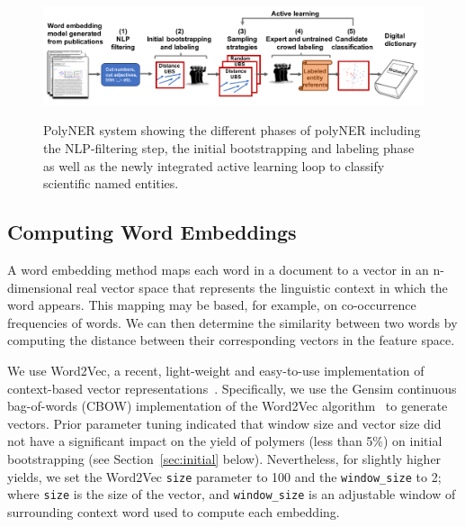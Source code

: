 \begin{figure}[!t]
{\includegraphics[width=\textwidth]{figures/architecture.pdf}}
\caption{\label{fig:architecture} PolyNER system showing the different phases of polyNER including the NLP-filtering step, the initial bootstrapping and labeling phase as well as the newly integrated active learning loop to classify scientific named entities. 
}
\end{figure}
\setlength{\belowcaptionskip}{-10pt}

\subsection{Computing Word Embeddings}\label{sec:wordembeddings}
A word embedding method maps each word
in a document to a vector in an n-dimensional real vector space that
represents the linguistic context in which the word appears. This mapping may
be based, for example, on co-occurrence frequencies of words. 
We can then determine the similarity between two words by computing the distance between
their corresponding vectors in the feature space.


We use Word2Vec, a recent, light-weight and easy-to-use implementation of context-based vector representations~\cite{mikolov2013efficient,mikolov2013distributed}.
Specifically, we use the Gensim continuous bag-of-words
(CBOW) implementation of the Word2Vec
algorithm~\cite{rehurek2010software} to generate vectors.
Prior parameter tuning indicated that window size and vector size did not have a significant impact on the yield of polymers (less than 5\%) on initial bootstrapping (see Section~\ref{sec:initial} below).
Nevertheless, for slightly higher yields,
we set the 
Word2Vec \texttt{size} parameter to 100 and the \texttt{window_size} to 2; 
where \texttt{size}  is the size of the vector, and \texttt{window_size}
is an adjustable window of surrounding context word used to compute each embedding.

